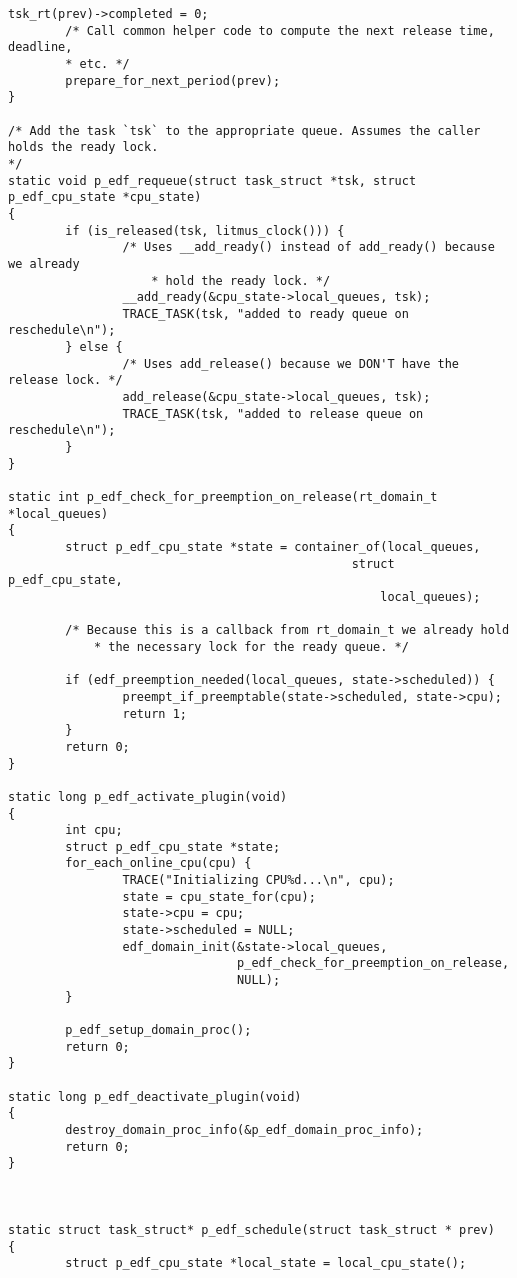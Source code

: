 \begin{lstlisting}[style=cstyle, caption=linux/litmus/sched\_p\_edf.c]
    tsk_rt(prev)->completed = 0;
        /* Call common helper code to compute the next release time, deadline,
        * etc. */
        prepare_for_next_period(prev);
}

/* Add the task `tsk` to the appropriate queue. Assumes the caller holds the ready lock.
*/
static void p_edf_requeue(struct task_struct *tsk, struct p_edf_cpu_state *cpu_state)
{
        if (is_released(tsk, litmus_clock())) {
                /* Uses __add_ready() instead of add_ready() because we already
                    * hold the ready lock. */
                __add_ready(&cpu_state->local_queues, tsk);
                TRACE_TASK(tsk, "added to ready queue on reschedule\n");
        } else {
                /* Uses add_release() because we DON'T have the release lock. */
                add_release(&cpu_state->local_queues, tsk);
                TRACE_TASK(tsk, "added to release queue on reschedule\n");
        }
}

static int p_edf_check_for_preemption_on_release(rt_domain_t *local_queues)
{
        struct p_edf_cpu_state *state = container_of(local_queues, 
                                                struct p_edf_cpu_state,
                                                    local_queues);

        /* Because this is a callback from rt_domain_t we already hold
            * the necessary lock for the ready queue. */

        if (edf_preemption_needed(local_queues, state->scheduled)) {
                preempt_if_preemptable(state->scheduled, state->cpu);
                return 1;
        }
        return 0;
}

static long p_edf_activate_plugin(void)
{
        int cpu;
        struct p_edf_cpu_state *state;
        for_each_online_cpu(cpu) {
                TRACE("Initializing CPU%d...\n", cpu);
                state = cpu_state_for(cpu);
                state->cpu = cpu;
                state->scheduled = NULL;
                edf_domain_init(&state->local_queues,
                                p_edf_check_for_preemption_on_release,
                                NULL);
        }

        p_edf_setup_domain_proc();
        return 0;
}

static long p_edf_deactivate_plugin(void)
{
        destroy_domain_proc_info(&p_edf_domain_proc_info);
        return 0;
}



static struct task_struct* p_edf_schedule(struct task_struct * prev)
{
        struct p_edf_cpu_state *local_state = local_cpu_state();


\end{lstlisting}
